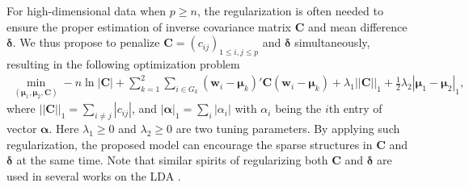 \documentclass[12pt]{article}
\begin{document}
For high-dimensional data when $p \geq n$, the regularization is often needed to ensure the proper estimation of inverse covariance matrix $\bm C$ and mean difference $\bm \delta$.
We thus propose to penalize $\bm C = (c_{ij})_{1 \leq i, j \leq p}$ and $\bm \delta$ simultaneously, resulting in the following optimization problem
\begin{align}\label{eq: 1}
\min_{(\bm \mu_1,\bm \mu_2,\bm C)} -n\ln|\bm C| + \sum_{k=1}^2\sum_{i\in G_k}(\bm w_i-\bm \mu_k)' \bm C (\bm w_i-\bm \mu_k)+\lambda_1||\bm C||_1 + \frac{1}{2} \lambda_2|\bm \mu_1-\bm \mu_2|_1,
\end{align}
where $||\bm C ||_1 = \sum_{i \neq j}  |c_{ij}|$, and
$|\bm \alpha|_1 = \mathop{\sum}\limits_i |\alpha_i|$ with $\alpha_i$ being the $i$th entry of vector $\bm \alpha$.
Here $\lambda_1\ge 0$ and $\lambda_2\ge 0$ are two tuning parameters.
By applying such regularization, the proposed model can encourage the sparse structures in $\bm C$ and $\bm \delta$ at the same time.
Note that similar spirits of regularizing both $\bm C$ and $\bm \delta$ are used in several works on the LDA \citep{Shao2011Sparse, cai2012a}.
\end{document}
